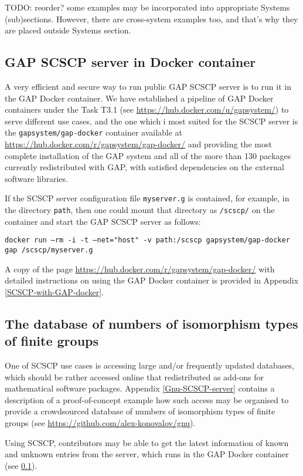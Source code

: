 \documentclass{deliverablereport}
\begin{document}
TODO: reorder? some examples may be incorporated 
into appropriate Systems (sub)sections. However, there
are cross-system examples too, and that's why they are
placed outside Systems section.

\subsection{GAP SCSCP server in Docker container}\label{gap-docker}

A very efficient and secure way to run public GAP SCSCP
server is to run it in the GAP Docker container. 
We have established a pipeline of GAP Docker containers
under the Task T3.1 (see \url{https://hub.docker.com/u/gapsystem/})
to serve different use cases, and the one which i most
suited for the SCSCP server is the {\tt gapsystem/gap-docker} 
container available at \url{https://hub.docker.com/r/gapsystem/gap-docker/} and
providing the most complete installation
of the GAP system and all of the more than 130 packages
currently redistributed with GAP, with satisfied dependencies
on the external software libraries.

If the SCSCP server configuration file {\tt myserver.g} is 
contained, for example, in the directory {\tt path}, 
then one could mount that directory as {\tt /scscp/} on the
container and start the GAP SCSCP server as follows:

{\tiny{\tt docker run --rm -i -t --net="host" -v path:/scscp gapsystem/gap-docker gap /scscp/myserver.g}}

A copy of the page \url{https://hub.docker.com/r/gapsystem/gap-docker/}
with detailed instructions on using the GAP Docker container 
is provided in Appendix \ref{SCSCP-with-GAP-docker}.


\subsection{The database of numbers of isomorphism
types of finite groups}\label{gnu-reproducibility}

One of SCSCP use cases is accessing large and/or frequently updated
databases, which should be rather accessed online that redistributed as
add-ons for mathematical software packages. Appendix \ref{Gnu-SCSCP-server}
contains a description of a proof-of-concept example how such access may
be organised to provide a crowdsourced database of numbers of isomorphism
types of finite groups (see  \url{https://github.com/alex-konovalov/gnu}). 

Using SCSCP, contributors may be able to get the latest information of 
known and unknown entries from the server, which runs in the GAP Docker 
container (see \ref{gap-docker}).
\end{document}
